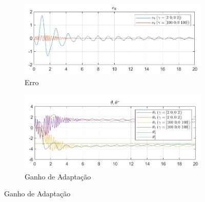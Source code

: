 \documentclass[10pt]{article}
\begin{document}
\begin{figure}[h!]
    \centering
    \begin{subfigure}[b]{0.45\textwidth}
        \centering
        \includegraphics[width=\textwidth]{img/fig02a.png}
        \caption{Erro}
    \end{subfigure}
    \begin{subfigure}[b]{0.45\textwidth}
        \centering
        \includegraphics[width=\textwidth]{img/fig02b.png}
        \caption{Ganho de Adaptação}
    \end{subfigure}

    \vspace{0.5cm}


\end{figure}
\end{document}
